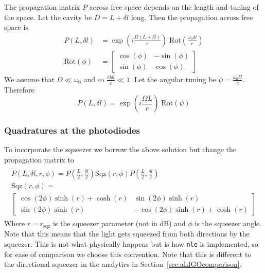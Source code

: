 \documentclass[aps,pra,superscriptaddress,reprint,nofootinbib]{revtex4-1}
\newcommand{\code}[1]{\texttt{#1}}
\begin{document}
The propagation matrix $P$ across free space depends on the length and tuning of the space. Let the cavity be $D = L + \delta l$ long. Then the propagation across free space is
\begin{align}
P(L, \delta l) &= \exp\left(i\frac{\Omega (L + \delta l)}{c}\right) \;\mathrm{Rot}\left(\frac{\omega_0 \delta l}{c}\right) \\
\mathrm{Rot}(\phi) &= \begin{bmatrix}
\cos(\phi) & -\sin(\phi)\\ 
\sin(\phi) & \cos(\phi)\nonumber
\end{bmatrix}
\end{align}
We assume that $\Omega \ll \omega_0$ and so $\frac{\Omega \delta l}{c} \ll 1$. Let the angular tuning be $\psi = \frac{\omega_0 \delta l}{c}$. Therefore
\begin{equation}
P(L, \delta l) = \exp\left(i\frac{\Omega L}{c}\right) \;\mathrm{Rot}\left(\psi\right)
\end{equation}

\subsubsection{Quadratures at the photodiodes}

To incorporate the squeezer we borrow the above solution but change the propagation matrix to
\begin{align}
	\begin{gathered}
	\tilde{P}(L, \delta l, r, \phi) = P\left(\frac{L}{2}, \frac{\delta l}{2}\right) \mathrm{Sqz}(r, \phi) P\left(\frac{L}{2}, \frac{\delta l}{2}\right) \\
	\mathrm{Sqz}(r, \phi) =\\
	\begin{bmatrix}
	\cos(2 \phi) \sinh(r) + \cosh(r) & \sin(2\phi) \sinh(r)\\ 
	\sin(2\phi) \sinh(r) & -\cos(2 \phi) \sinh(r) + \cosh(r)
	\end{bmatrix}
	\end{gathered}
\end{align}
Where $r = r_\mathrm{sqz}$ is the squeezer parameter (not in dB) and $\phi$ is the squeezer angle. Note that this means that the light gets squeezed from both directions by the squeezer. This is not what physically happens but is how \code{nle} is implemented, so for ease of comparison we choose this convention. Note that this is different to the directional squeezer in the analytics in Section~\ref{sec:aLIGOcomparison}.
\end{document}

